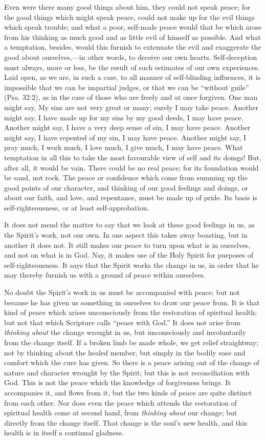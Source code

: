 \documentclass[
]{book}
\begin{document}
Even were there many good things about him, they could not speak peace; for the good things which might speak peace, could not make up for the evil things which speak trouble; and what a poor, self-made peace would that be which arose from his thinking as much good and as little evil of himself as possible. And what a temptation, besides, would this furnish to extenuate the evil and exaggerate the good about ourselves,---in other words, to deceive our own hearts. Self-deception must always, more or less, be the result of such estimates of our own experiences. Laid open, as we are, in such a case, to all manner of self-blinding influences, it is impossible that we can be impartial judges, or that we can be ``without guile'' (Psa. 32:2), as in the case of those who are freely and at once forgiven.
One man might say, My sins are not very great or many; surely I may take peace. Another might say, I have made up for my sins by my good deeds, I may have peace. Another might say, I have a very deep sense of sin, I may have peace. Another might say, I have repented of my sin, I may have peace. Another might say, I pray much, I work much, I love much, I give much, I may have peace. What temptation in all this to take the most favourable view of self and its doings! But, after all, it would be vain. There could be no real peace; for its foundation would be sand, not rock. The peace or confidence which come from summing up the good points of our character, and thinking of our good feelings and doings, or about our faith, and love, and repentance, must be made up of pride. Its basis is self-righteousness, or at least self-approbation.

It does not mend the matter to say that we look at these good feelings in us, as the Spirit's work, not our own. In one aspect this takes away boasting, but in another it does not. It still makes our peace to turn upon what is in ourselves, and not on what is in God. Nay, it makes use of the Holy Spirit for purposes of self-righteousness. It says that the Spirit works the change in us, in order that he may thereby furnish us with a ground of peace within ourselves.

No doubt the Spirit's work in us must be accompanied with peace; but not because he has given us something in ourselves to draw our peace from. It is that kind of peace which arises unconsciously from the restoration of spiritual health; but not that which Scripture calls ``peace with God.'' It does not arise from \emph{thinking about} the change wrought in us, but unconsciously and involuntarily from the change itself. If a broken limb be made whole, we get relief straightway; not by thinking about the healed member, but simply in the bodily ease and comfort which the cure has given. So there is a peace arising out of the change of nature and character wrought by the Spirit; but this is not reconciliation with God. This is not the peace which the knowledge of forgiveness brings. It accompanies it, and flows from it, but the two kinds of peace are quite distinct from each other. Nor does even the peace which attends the restoration of spiritual health come at second hand, from \emph{thinking about} our change; but directly from the change itself. That change is the soul's new health, and this health is in itself a continual gladness.
\end{document}
